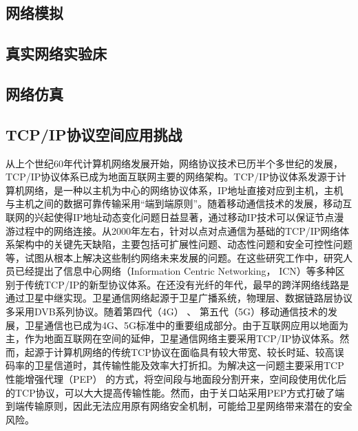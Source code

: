 \documentclass[winfonts,phd,twoside]{njuthesis}
\begin{document}
\subsection{网络模拟}

\subsection{真实网络实验床}

\subsection{网络仿真}

\subsection{TCP/IP协议空间应用挑战}
从上个世纪60年代计算机网络发展开始，网络协议技术已历半个多世纪的发展，TCP/IP协议体系已成为地面互联网主要的网络架构。TCP/IP协议体系发源于计算机网络，是一种以主机为中心的网络协议体系，IP地址直接对应到主机，主机与主机之间的数据可靠传输采用“端到端原则”。随着移动通信技术的发展，移动互联网的兴起使得IP地址动态变化问题日益显著，通过移动IP技术可以保证节点漫游过程中的网络连接。从2000年左右，针对以点对点通信为基础的TCP/IP网络体系架构中的关键先天缺陷，主要包括可扩展性问题、动态性问题和安全可控性问题等，试图从根本上解决这些制约网络未来发展的问题。在这些研究工作中，研究人员已经提出了信息中心网络（Information Centric Networking， ICN）等多种区别于传统TCP/IP的新型协议体系。在还没有光纤的年代，最早的跨洋网络线路是通过卫星中继实现。卫星通信网络起源于卫星广播系统，物理层、数据链路层协议多采用DVB系列协议。随着第四代（4G） 、 第五代（5G）移动通信技术的发展，卫星通信也已成为4G、5G标准中的重要组成部分。由于互联网应用以地面为主，作为地面互联网在空间的延伸，卫星通信网络主要采用TCP/IP协议体系。然而，起源于计算机网络的传统TCP协议在面临具有较大带宽、较长时延、较高误码率的卫星信道时，其传输性能及效率大打折扣。为解决这一问题主要采用TCP性能增强代理（PEP） 的方式，将空间段与地面段分割开来，空间段使用优化后的TCP协议，可以大大提高传输性能。然而，由于关口站采用PEP方式打破了端到端传输原则，因此无法应用原有网络安全机制，可能给卫星网络带来潜在的安全风险。
\end{document}
